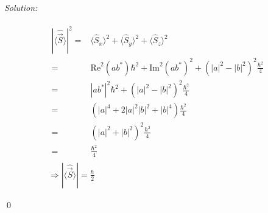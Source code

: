\documentclass[12pt,a4paper]{article}
\newenvironment{sol}
    {\emph{Solution:}
    }
    {
    \qed
    }
\begin{document}
\begin{sol}
\begin{itemize}
\begin{gather}
\begin{align}
\nonumber|\langle\hat{\vec{S}}\rangle|^2=&\langle\hat{S}_x\rangle^2+\langle\hat{S}_y\rangle^2+\langle\hat{S}_z\rangle^2\\
\nonumber=&\text{Re}^2(ab^*)\hbar^2+\text{Im}^2(ab^*)^2+(|a|^2-|b|^2)^2\frac{\hbar^2}{4}\\
\nonumber=&|ab^*|^2\hbar^2+(|a|^2-|b|^2)^2\frac{\hbar^2}{4}\\
\nonumber=&(|a|^4+2|a|^2|b|^2+|b|^4)\frac{\hbar^2}{4}\\
\nonumber=&(|a|^2+|b|^2)^2\frac{\hbar^2}{4}\\
=&\frac{\hbar^2}{4}
\end{align}\\
\Longrightarrow|\langle\hat{\vec{S}}\rangle|=\frac{\hbar}{2}
\end{gather}
\end{itemize}
\end{sol}
\end{document}
